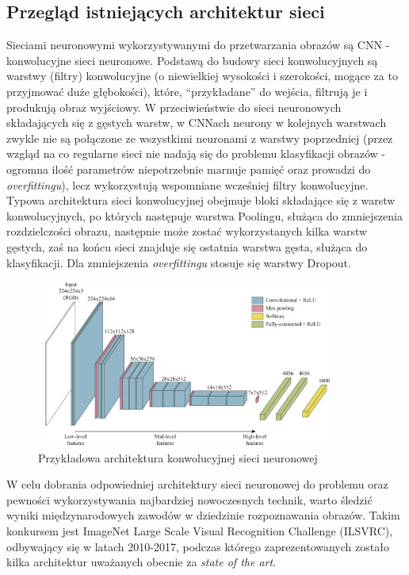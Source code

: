 \documentclass[polish,12pt]{aghthesis}
\begin{document}
\subsection{Przegląd istniejących architektur sieci}
\par Sieciami neuronowymi wykorzystywanymi do przetwarzania obrazów są CNN - konwolucyjne sieci neuronowe. Podstawą do budowy sieci konwolucyjnych są warstwy (filtry) konwolucyjne (o niewielkiej wysokości i szerokości, mogące za to przyjmować duże głębokości), które, ``przykładane'' do wejścia, filtrują je i produkują obraz wyjściowy. W przeciwieństwie do sieci neuronowych składających się z gęstych warstw, w CNNach neurony w kolejnych warstwach zwykle nie są połączone ze wszystkimi neuronami z warstwy poprzedniej (przez wzgląd na co regularne sieci nie nadają się do problemu klasyfikacji obrazów - ogromna ilość parametrów niepotrzebnie marnuje pamięć oraz prowadzi do \textit{overfittingu}), lecz wykorzystują wspomniane wcześniej filtry konwolucyjne. Typowa architektura sieci konwolucyjnej obejmuje bloki składające się z warstw konwolucyjnych, po których następuje warstwa Poolingu, służąca do zmniejszenia rozdzielczości obrazu, następnie może zostać wykorzystanych kilka warstw gęstych, zaś na końcu sieci znajduje się ostatnia warstwa gęsta, służąca do klasyfikacji. Dla zmniejszenia \textit{overfittingu} stosuje się warstwy Dropout.
\begin{figure}[ht]
    \centering
    \includegraphics[width=10cm, height=5.5cm]{images/cnn.jpg}
    \caption{Przykładowa architektura konwolucyjnej sieci neuronowej\cite{artCnn}}
    \label{fig:cnn-architecture}
\end{figure}
\par
W celu dobrania odpowiedniej architektury sieci neuronowej do problemu oraz pewności wykorzystywania najbardziej nowoczesnych technik, warto śledzić wyniki międzynarodowych zawodów w dziedzinie rozpoznawania obrazów. Takim konkursem jest ImageNet Large Scale Visual Recognition Challenge (ILSVRC), odbywający się w latach 2010-2017, podczas którego zaprezentowanych zostało kilka architektur uważanych obecnie za \textit{state of the art}. 
\end{document}
